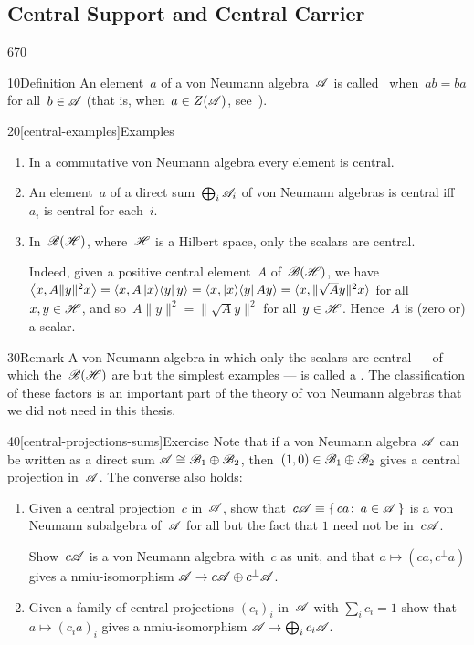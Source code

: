 \subsection{Central Support and Central Carrier}
\begin{parsec}{670}%
\begin{point}{10}{Definition}%
An element~$a$ of a von Neumann algebra~$\mathscr{A}$
is called~%
when~$ab=ba$ for all~$b\in\mathscr{A}$
(that is, when~$a\in Z(\mathscr{A})$, see~).
\end{point}
\begin{point}{20}[central-examples]{Examples}%
\begin{enumerate}
\item
In a commutative von Neumann algebra
every element is central.
\item
An element~$a$ of a direct sum~$\bigoplus_i \mathscr{A}_i$
of von Neumann algebras
is central iff~$a_i$ is central for each~$i$.
\item
In~$\mathscr{B}(\mathscr{H})$,
where~$\mathscr{H}$ is a Hilbert space,
only the scalars are central.

Indeed,
given a positive central element~$A$ 
of~$\mathscr{B}(\mathscr{H})$,
we have $\left<x, A\|y\|^2 x\right>
= \left<x,A \left|x\right>\!\left<y\right| y\right>
= \left<x,\left|x\right>\!\left<y\right|A y\right>
= \left<x,\smash{\|\sqrt{A}y\|^2 }x\right>$
for all~$x,y\in\mathscr{H}$,
and so~$A\|y\|^2= \|\sqrt{A}y\|^2$
for all~$y\in\mathscr{H}$.
Hence~$A$ is (zero or) a scalar.

\end{enumerate}
\end{point}
\begin{point}{30}{Remark}%
A von Neumann algebra
in which only the scalars are central
--- of which the~$\mathscr{B}(\mathscr{H})$ are but the simplest examples ---
	is called a .
The classification of these factors
is an important part
of the theory of von Neumann algebras
that we did not need in this thesis.
\end{point}
\begin{point}{40}[central-projections-sums]{Exercise}%
Note that if a von Neumann algebra
$\mathscr{A}$ can be written as
a direct sum $\mathscr{A}\cong \mathscr{B}_1\oplus \mathscr{B}_2$,
then~$(1,0)\in\mathscr{B}_1\oplus\mathscr{B}_2$ gives
a central projection in~$\mathscr{A}$.
The converse also holds:
\begin{enumerate}
\item
Given a central projection~$c$ in~$\mathscr{A}$,
show that~$c\mathscr{A} \equiv \{\,ca\colon\, a\in\mathscr{A}\,\}$ 
is a von Neumann subalgebra of~$\mathscr{A}$
for all but the fact that $1$ need not be in~$c\mathscr{A}$.

Show~$c\mathscr{A}$
is a von Neumann algebra with~$c$ as unit,
and that $a\mapsto (ca,c^\perp a)$
gives a nmiu-isomorphism
$\mathscr{A}\to c\mathscr{A}\oplus c^\perp \mathscr{A}$.
\item
Given a family of central projections $(c_i)_i$ in~$\mathscr{A}$
with $\sum_i c_i=1$
show that $a\mapsto (c_ia)_i$
gives a nmiu-isomorphism $\mathscr{A}\to\bigoplus_i c_i \mathscr{A}$.
\end{enumerate}
\end{point}
\end{parsec}
